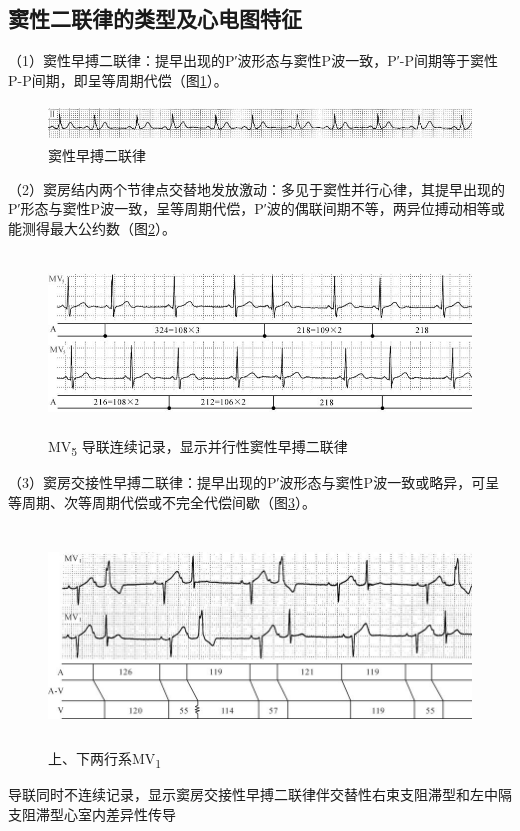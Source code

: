 \subsection{窦性二联律的类型及心电图特征}

（1）窦性早搏二联律：提早出现的P′波形态与窦性P波一致，P′-P间期等于窦性P-P间期，即呈等周期代偿（图\ref{fig37-1}）。

\begin{figure}[!htbp]
 \centering
 \includegraphics[width=5.58333in,height=0.38542in]{./images/Image00595.jpg}
 \captionsetup{justification=centering}
 \caption{窦性早搏二联律}
 \label{fig37-1}
  \end{figure} 

（2）窦房结内两个节律点交替地发放激动：多见于窦性并行心律，其提早出现的P′形态与窦性P波一致，呈等周期代偿，P′波的偶联间期不等，两异位搏动相等或能测得最大公约数（图\ref{fig37-2}）。

\begin{figure}[!htbp]
 \centering
 \includegraphics[width=5.69792in,height=1.875in]{./images/Image00596.jpg}
 \captionsetup{justification=centering}
 \caption{MV\textsubscript{5} 导联连续记录，显示并行性窦性早搏二联律}
 \label{fig37-2}
  \end{figure} 

（3）窦房交接性早搏二联律：提早出现的P′波形态与窦性P波一致或略异，可呈等周期、次等周期代偿或不完全代偿间歇（图\ref{fig37-3}）。

\begin{figure}[!htbp]
 \centering
 \includegraphics[width=5.77083in,height=2.27083in]{./images/Image00597.jpg}
 \captionsetup{justification=centering}
 \caption{上、下两行系MV\textsubscript{1}}
 \label{fig37-3}
  \end{figure} 
导联同时不连续记录，显示窦房交接性早搏二联律伴交替性右束支阻滞型和左中隔支阻滞型心室内差异性传导

